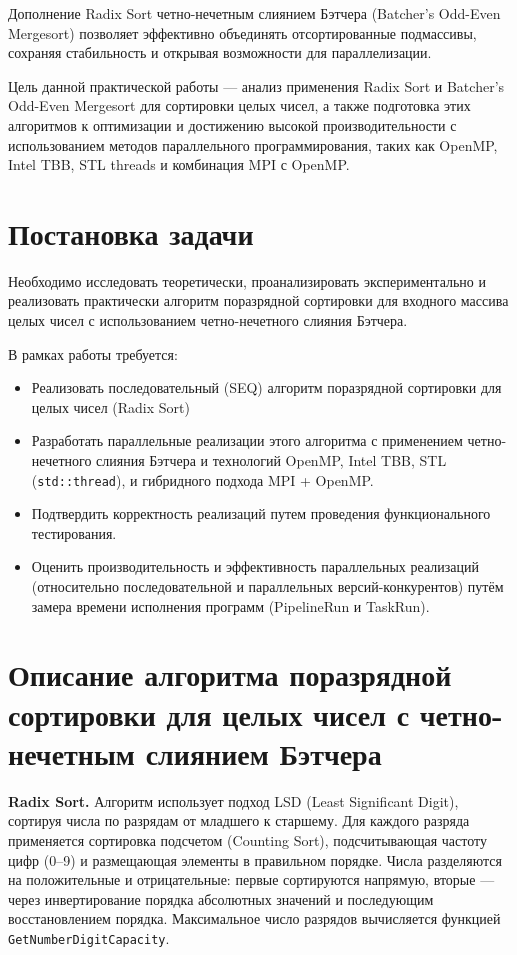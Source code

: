 \documentclass[a4paper,12pt]{article}
\begin{document}
Дополнение Radix Sort четно-нечетным слиянием Бэтчера (Batcher's Odd-Even Mergesort) позволяет эффективно объединять отсортированные подмассивы, сохраняя стабильность и открывая возможности для параллелизации. 

Цель данной практической работы — анализ применения Radix Sort и Batcher's Odd-Even Mergesort для сортировки целых чисел, а также подготовка этих алгоритмов к оптимизации и достижению высокой производительности с использованием методов параллельного программирования, таких как OpenMP, Intel TBB, STL threads и комбинация MPI с OpenMP.

\section*{Постановка задачи}
Необходимо исследовать теоретически, проанализировать экспериментально и реализовать практически алгоритм поразрядной сортировки для входного массива целых чисел с использованием четно-нечетного слияния Бэтчера.

В рамках работы требуется:

\begin{itemize}
    \item Реализовать последовательный (SEQ) алгоритм поразрядной сортировки для целых чисел (Radix Sort)
    \item Разработать параллельные реализации этого алгоритма с применением четно-нечетного слияния Бэтчера и технологий OpenMP, Intel TBB, STL (\texttt{std::thread}), и гибридного подхода MPI + OpenMP.
    \item Подтвердить корректность реализаций путем проведения функционального тестирования.
    \item Оценить производительность и эффективность параллельных реализаций (относительно последовательной и параллельных версий-конкурентов) путём замера времени исполнения программ (PipelineRun и TaskRun).
\end{itemize}

\section*{Описание алгоритма поразрядной сортировки для целых чисел с четно-нечетным слиянием Бэтчера}
\textbf{Radix Sort.} Алгоритм использует подход LSD (Least Significant Digit), сортируя числа по разрядам от младшего к старшему. Для каждого разряда применяется сортировка подсчетом (Counting Sort), подсчитывающая частоту цифр (0–9) и размещающая элементы в правильном порядке. Числа разделяются на положительные и отрицательные: первые сортируются напрямую, вторые — через инвертирование порядка абсолютных значений и последующим восстановлением порядка. Максимальное число разрядов вычисляется функцией \texttt{GetNumberDigitCapacity}.
\end{document}

